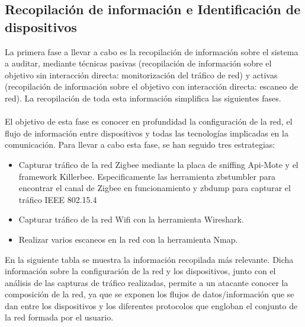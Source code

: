 \subsection{Recopilación de información e Identificación de dispositivos} %
La primera fase a llevar a cabo es la recopilación de información sobre el sistema a auditar, mediante técnicas pasivas (recopilación de información sobre el objetivo sin interacción directa: monitorización del tráfico de red) y activas (recopilación de información sobre el objetivo con interacción directa: escaneo de red). La recopilación de toda esta información simplifica las siguientes fases.
\\\\El objetivo de esta fase es conocer en profundidad la configuración de la red, el flujo de información entre dispositivos y todas las tecnologías implicadas en la comunicación. Para llevar a cabo esta fase, se han seguido tres estrategias:
\begin{itemize}
\item Capturar tráfico de la red Zigbee mediante la placa de sniffing Api-Mote y el framework Killerbee. Especificamente las herramienta zbstumbler para encontrar el canal de Zigbee en funcionamiento y zbdump para capturar el tráfico IEEE 802.15.4
\item Capturar tráfico de la red Wifi con la herramienta Wireshark.
\item Realizar varios escaneos en la red con la herramienta Nmap.
\end{itemize}
\vspace{0.6cm}
En la siguiente tabla se muestra la información recopilada más relevante. Dicha información sobre la configuración de la red y los dispositivos, junto con el análisis de las capturas de tráfico realizadas, permite a un atacante conocer la composición de la red, ya que se exponen los flujos de datos/información que se dan entre los dispositivos y los diferentes protocolos que engloban el conjunto de la red formada por el usuario.

